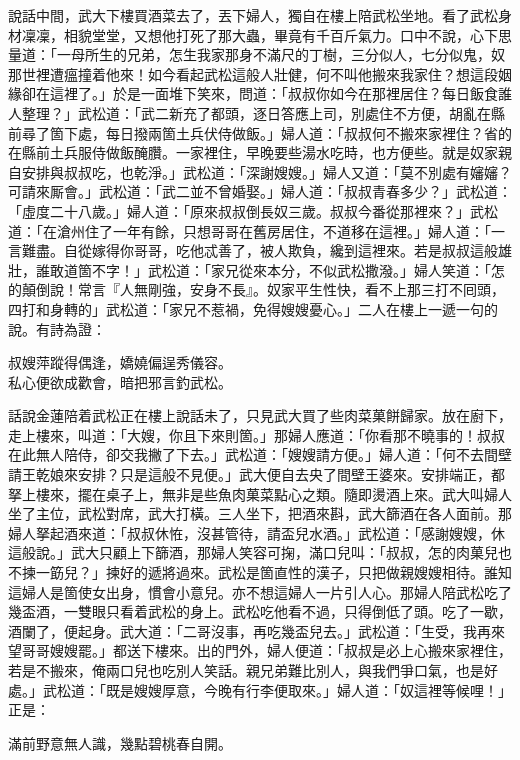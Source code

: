 說話中間，武大下樓買酒菜去了，丟下婦人，獨自在樓上陪武松坐地。看了武松身材凜凜，相貌堂堂，{}又想他打死了那大蟲，畢竟有千百斤氣力。{}口中不說，心下思量道：「一母所生的兄弟，怎生我家那身不滿尺的丁樹，三分似人，七分似鬼，奴那世裡遭瘟撞着他來！如今看起武松這般人壯健，何不叫他搬來我家住？想這段姻緣卻在這裡了。」{}於是一面堆下笑來，問道：「叔叔你如今在那裡居住？每日飯食誰人整理？」武松道：「武二新充了都頭，逐日答應上司，別處住不方便，胡亂在縣前尋了箇下處，每日撥兩箇土兵伏侍做飯。」婦人道：「叔叔何不搬來家裡住？省的在縣前土兵服侍做飯醃臢。一家裡住，早晚要些湯水吃時，也方便些。就是奴家親自安排與叔叔吃，也乾淨。」武松道：「深謝嫂嫂。」婦人又道：「莫不別處有嬸嬸？{}可請來厮會。」武松道：「武二並不曾婚娶。」婦人道：「叔叔青春多少？」武松道：「虛度二十八歲。」婦人道：「原來叔叔倒長奴三歲。叔叔今番從那裡來？」武松道：「在滄州住了一年有餘，只想哥哥在舊房居住，不道移在這裡。」婦人道：「一言難盡。自從嫁得你哥哥，吃他忒善了，被人欺負，纔到這裡來。若是叔叔這般雄壯，{}誰敢道箇不字！」武松道：「家兄從來本分，不似武松撒潑。」{}婦人笑道：「怎的顛倒說！常言『人無剛強，安身不長』。奴家平生性快，看不上那三打不囘頭，四打和身轉的」武松道：「家兄不惹禍，免得嫂嫂憂心。」二人在樓上一遞一句的說。有詩為證：

\begin{myquote}
叔嫂萍蹤得偶逢，嬌嬈偏逞秀儀容。\\
私心便欲成歡會，暗把邪言釣武松。
\end{myquote}

話說金蓮陪着武松正在樓上說話未了，只見武大買了些肉菜菓餅歸家。放在廚下，走上樓來，叫道：「大嫂，你且下來則箇。」那婦人應道：「你看那不曉事的！叔叔在此無人陪侍，卻交我撇了下去。」{}武松道：「嫂嫂請方便。」婦人道：「何不去間壁請王乾娘來安排？{}只是這般不見便。」武大便自去央了間壁王婆來。安排端正，都拏上樓來，擺在桌子上，無非是些魚肉菓菜點心之類。隨即燙酒上來。武大叫婦人坐了主位，武松對席，武大打橫。三人坐下，把酒來斟，武大篩酒在各人面前。那婦人拏起酒來道：「叔叔休恠，沒甚管待，請盃兒水酒。」武松道：「感謝嫂嫂，休這般說。」武大只顧上下篩酒，那婦人笑容可掬，滿口兒叫：「叔叔，怎的肉菓兒也不揀一筯兒？」{}揀好的遞將過來。武松是箇直性的漢子，只把做親嫂嫂相待。誰知這婦人是箇使女出身，慣會小意兒。亦不想這婦人一片引人心。那婦人陪武松吃了幾盃酒，一雙眼只看着武松的身上。武松吃他看不過，只得倒低了頭。{}吃了一歇，酒闌了，便起身。武大道：「二哥沒事，再吃幾盃兒去。」武松道：「生受，我再來望哥哥嫂嫂罷。」都送下樓來。出的門外，婦人便道：「叔叔是必上心搬來家裡住，若是不搬來，俺兩口兒也吃別人笑話。親兄弟難比別人，與我們爭口氣，也是好處。」{}武松道：「既是嫂嫂厚意，今晚有行李便取來。」婦人道：「奴這裡等候哩！」正是：

\begin{myquote}
滿前野意無人識，幾點碧桃春自開。
\end{myquote}

